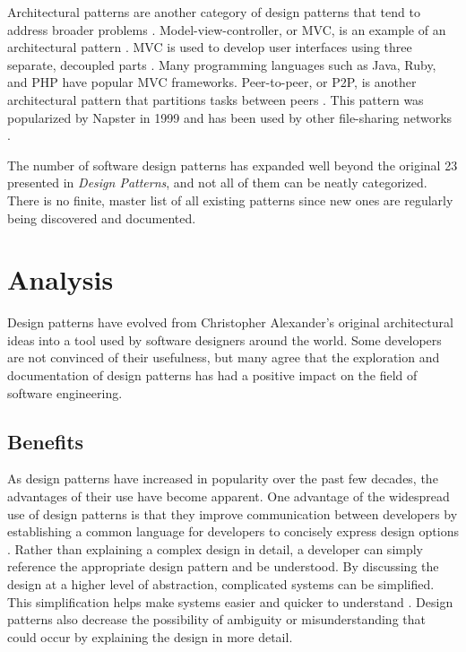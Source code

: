 \documentclass[11pt]{article}
\begin{document}
Architectural patterns are another category of design patterns that tend to address broader problems \cite{arnold1999}. Model-view-controller, or MVC, is an example of an architectural pattern \cite{arnold1999}. MVC is used to develop user interfaces using three separate, decoupled parts \cite{arnold1999}. Many programming languages such as Java, Ruby, and PHP have popular MVC frameworks. Peer-to-peer, or P2P, is another architectural pattern that partitions tasks between peers \cite{arnold1999}. This pattern was popularized by Napster in 1999 and has been used by other file-sharing networks \cite{arnold1999}.

The number of software design patterns has expanded well beyond the original 23 presented in \textit{Design Patterns}, and not all of them can be neatly categorized. There is no finite, master list of all existing patterns since new ones are regularly being discovered and documented.


\section{Analysis}

Design patterns have evolved from Christopher Alexander's original architectural ideas into a tool used by software designers around the world. Some developers are not convinced of their usefulness, but many agree that the exploration and documentation of design patterns has had a positive impact on the field of software engineering.

\subsection{Benefits}

As design patterns have increased in popularity over the past few decades, the advantages of their use have become apparent. One advantage of the widespread use of design patterns is that they improve communication between developers by establishing a common language for developers to concisely express design options \cite{doty}. Rather than explaining a complex design in detail, a developer can simply reference the appropriate design pattern and be understood. By discussing the design at a higher level of abstraction, complicated systems can be simplified. This simplification helps make systems easier and quicker to understand \cite{doty}. Design patterns also decrease the possibility of ambiguity or misunderstanding that could occur by explaining the design in more detail. 
\end{document}
